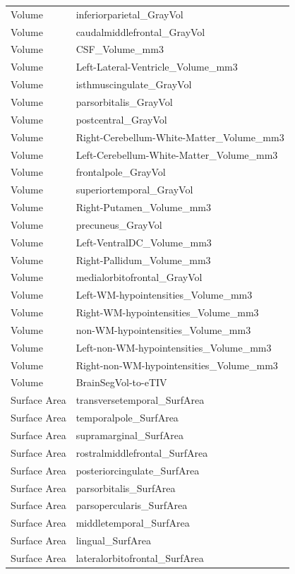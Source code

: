 \documentclass[pdflatex,sn-nature]{sn-jnl}%
\theoremstyle{thmstyleone}%
\theoremstyle{thmstyletwo}%
\theoremstyle{thmstylethree}%
\begin{document}
\begin{appendices}
\begin{small}
\begin{longtable}{l|l}
Volume & inferiorparietal\_GrayVol \\
Volume & caudalmiddlefrontal\_GrayVol \\
Volume & CSF\_Volume\_mm3 \\
Volume & Left-Lateral-Ventricle\_Volume\_mm3 \\
Volume & isthmuscingulate\_GrayVol \\
Volume & parsorbitalis\_GrayVol \\
Volume & postcentral\_GrayVol \\
Volume & Right-Cerebellum-White-Matter\_Volume\_mm3 \\
Volume & Left-Cerebellum-White-Matter\_Volume\_mm3 \\
Volume & frontalpole\_GrayVol \\
Volume & superiortemporal\_GrayVol \\
Volume & Right-Putamen\_Volume\_mm3 \\
Volume & precuneus\_GrayVol \\
Volume & Left-VentralDC\_Volume\_mm3 \\
Volume & Right-Pallidum\_Volume\_mm3 \\
Volume & medialorbitofrontal\_GrayVol \\
Volume & Left-WM-hypointensities\_Volume\_mm3 \\
Volume & Right-WM-hypointensities\_Volume\_mm3 \\
Volume & non-WM-hypointensities\_Volume\_mm3 \\
Volume & Left-non-WM-hypointensities\_Volume\_mm3 \\
Volume & Right-non-WM-hypointensities\_Volume\_mm3 \\
Volume & BrainSegVol-to-eTIV \\
\midrule
Surface Area & transversetemporal\_SurfArea \\
Surface Area & temporalpole\_SurfArea \\
Surface Area & supramarginal\_SurfArea \\
Surface Area & rostralmiddlefrontal\_SurfArea \\
Surface Area & posteriorcingulate\_SurfArea \\
Surface Area & parsorbitalis\_SurfArea \\
Surface Area & parsopercularis\_SurfArea \\
Surface Area & middletemporal\_SurfArea \\
Surface Area & lingual\_SurfArea \\
Surface Area & lateralorbitofrontal\_SurfArea \\

\end{longtable}
\end{small}
\end{appendices}
\end{document}
